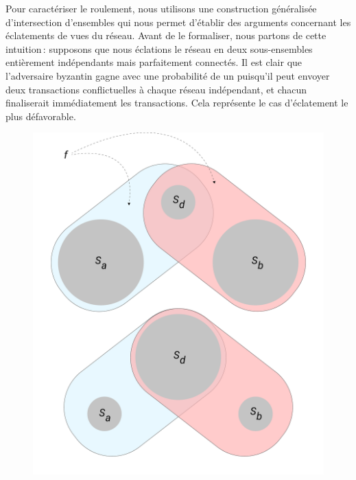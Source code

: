\documentclass[a4,twocolumn,10pt]{article}
\let\emptyset\varnothing
\theoremstyle{definition}
\begin{document}
\begin{appendices}
{%
Pour caractériser le roulement, nous utilisons une construction généralisée d'intersection d'ensembles qui nous permet d'établir des arguments concernant les éclatements de vues du réseau. Avant de le formaliser, nous partons de cette intuition\,: supposons que nous éclations le réseau en deux sous-ensembles entièrement indépendants mais parfaitement connectés. Il est clair que l'adversaire byzantin gagne avec une probabilité de un puisqu'il peut envoyer deux transactions conflictuelles à chaque réseau indépendant, et chacun fina\-liserait immédiatement les transactions. Cela représente le cas d'éclatement le plus défavorable.
\begin{figure}
\centering
\includegraphics[width=0.8\linewidth]{figures/network_view.pdf}

\end{figure}}
\end{appendices}
\end{document}
